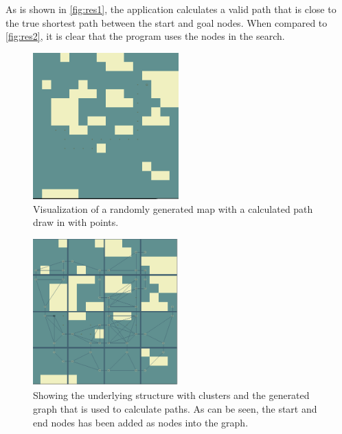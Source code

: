 \documentclass[12 pt]{article} %
\begin{document}
As is shown in \autoref{fig:res1}, the application calculates a valid path that is close to the true shortest path between the start and goal nodes.
When compared to \autoref{fig:res2}, it is clear that the program uses the nodes in the search.

\begin{figure}[!h]
	\centering
	\includegraphics[width=0.5\textwidth]{fig/res2.png}
	\caption{Visualization of a randomly generated map with a calculated path draw in with points.}
	\label{fig:res2}
\end{figure}

\begin{figure}[!h]
	\centering
	\includegraphics[width=0.5\textwidth]{fig/res1.png}
	\caption{Showing the underlying structure with clusters and the generated graph that is used to calculate paths. As can be seen, the start and end nodes has been added as nodes into the graph.}
	\label{fig:res1}
\end{figure}
\clearpage
\end{document}
